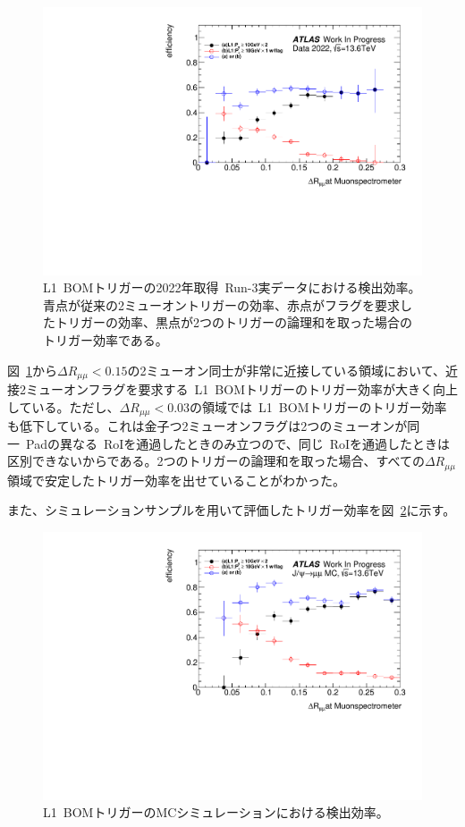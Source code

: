 \begin{figure}[h]
    \centering
    \includegraphics[clip, width=12cm]{fig/4/BOM_eff.pdf}
    \caption{L1~BOMトリガーの2022年取得~Run-3実データにおける検出効率。青点が従来の2ミューオントリガーの効率、赤点がフラグを要求したトリガーの効率、黒点が2つのトリガーの論理和を取った場合のトリガー効率である。}
    \label{fig:L1BOMEffData}
\end{figure}

図~\ref{fig:L1BOMEffData}から$\Delta R_{\mu\mu}<0.15$の2ミューオン同士が非常に近接している領域において、近接2ミューオンフラグを要求する~L1~BOMトリガーのトリガー効率が大きく向上している。ただし、$\Delta R_{\mu\mu}<0.03$の領域では~L1~BOMトリガーのトリガー効率も低下している。これは金子つ2ミューオンフラグは2つのミューオンが同一~Padの異なる~RoIを通過したときのみ立つので、同じ~RoIを通過したときは区別できないからである。2つのトリガーの論理和を取った場合、すべての$\Delta R_{\mu\mu}$領域で安定したトリガー効率を出せていることがわかった。

また、シミュレーションサンプルを用いて評価したトリガー効率を図~\ref{fig:L1BOMEffMC}に示す。

\begin{figure}[h]
    \centering
    \includegraphics[clip, width=12cm]{fig/4/BOM_MC_eff.pdf}
    \caption{L1~BOMトリガーのMCシミュレーションにおける検出効率。}
    \label{fig:L1BOMEffMC}
\end{figure}

